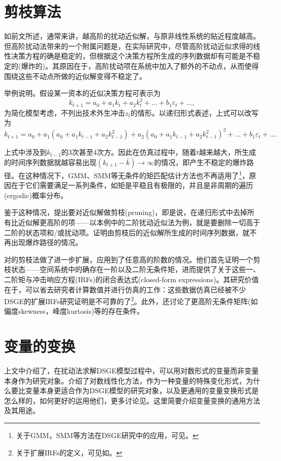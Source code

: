 \section{剪枝算法}
\label{sec:pta-pruning-algorithm}
如前文所述，通常来讲，越高阶的扰动近似解，与原非线性系统的贴近程度越高。但高阶扰动法带来的一个附属问题是，在实际研究中，尽管高阶扰动近似求得的线性决策方程的确是稳定的，但根据这个决策方程所生成的序列数据却有可能是不稳定的(爆炸的)。其原因在于，高阶扰动项在系统中加入了额外的不动点，从而使得围绕这些不动点所做的近似解变得不稳定了\citep{Kim:2008jw,denHaan:2012hv}。

举例说明。假设某一资本的近似决策方程可表示为
\begin{equation*}
  k_{t+1} = a_0 + a_1 k_t + a_2 k_t^2 + \ldots + b_1 \varepsilon_t + \ldots,
\end{equation*}
为简化模型考虑，不列出技术外生冲击$z_t$的情形。以递归形式表述，上式可以改写为
\begin{equation*}
k_{t+1} = a_0 + a_1 \left( a_0 + a_1 k_{t-1} + a_2 k_{t-1}^2 \right) + a_2 \left( a_0 + a_1 k_{t-1} + a_2 k_{t-1}^2 \right)^2 + \ldots + b_1 \varepsilon_t + \ldots.
\end{equation*}

上式中涉及到$k_{t-1}$的3次甚至4次方。因此在仿真过程中，随着$t$越来越大，所生成的时间序列数据就越容易出现$\left( k_{t+1}-\bar{k} \right) \rightarrow \infty$的情况，即产生不稳定的爆炸路径。在这种情况下，GMM、SMM等无条件的矩匹配估计方法也不再适用了\footnote{关于GMM，SMM等方法在DSGE研究中的应用，可见\cite{RugeMurcia:2007ha}。}，原因在于它们需要满足一系列条件，如矩是平稳且有极限的，并且是非周期的遍历(ergodic)概率分布。

鉴于这种情况，\cite{Kim:2008jw}提出要对近似解做剪枝(pruning)，即是说，在递归形式中去掉所有比近似解更高阶的项——以本例中的二阶扰动近似法为例，就是要删除一切高于二阶的状态项和/或扰动项。\cite{Kim:2008jw}证明由剪枝后的近似解所生成的时间序列数据，就不再出现爆炸路径的情况。

\cite{Andreasen:2016cd}对\cite{Kim:2008jw}的剪枝法做了进一步扩展，应用到了任意高的阶数的情况。他们首先证明一个剪枝状态——空间系统中的确存在一阶以及二阶无条件矩，进而提供了关于这些一、二阶矩与冲击响应方程(IRFs)的闭合表达式(closed-form expressions)。其研究价值在于，可以省去研究者计算数值并进行仿真的工作：这些数据仿真已经被不少DSGE的扩展IRFs研究证明是不可靠的了\footnote{关于扩展IRFs的定义，可见如\cite{Koop:1996cs}。}。此外，\cite{Andreasen:2016cd}还讨论了更高阶无条件矩阵(如偏度skewness，峰度kurtosis)等的存在条件。

\section{变量的变换}
\label{sec:perturbation-change-variables}
上文中介绍了，在扰动法求解DSGE模型过程中，可以用对数形式的变量而非变量本身作为研究对象。\cite{Jin:2002HV}介绍了对数线性化方法，作为一种变量的特殊变化形式，为什么要比变量本身更适合作为DSGE模型的研究对象，以及更通用的变量变换形式是怎么样的，如何更好的运用他们，更多讨论见\cite{FernandezVillaverde:2006hr}。这里简要介绍变量变换的通用方法及其用途。

